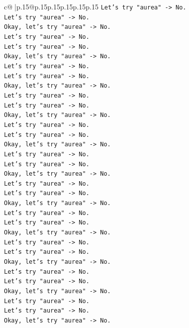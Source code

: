 \documentclass{article}
\begin{document}
{\begin{supertabular}{c@{$\;$}|p{.15\linewidth}@{}p{.15\linewidth}p{.15\linewidth}p{.15\linewidth}p{.15\linewidth}p{.15\linewidth}}
{{{\texttt{Let's try "aurea" {-}> No.} \\
\texttt{Let's try "aurea" {-}> No.} \\
\texttt{Okay, let's try "aurea" {-}> No.} \\
\texttt{Let's try "aurea" {-}> No.} \\
\texttt{Let's try "aurea" {-}> No.} \\
\texttt{Okay, let's try "aurea" {-}> No.} \\
\texttt{Let's try "aurea" {-}> No.} \\
\texttt{Let's try "aurea" {-}> No.} \\
\texttt{Okay, let's try "aurea" {-}> No.} \\
\texttt{Let's try "aurea" {-}> No.} \\
\texttt{Let's try "aurea" {-}> No.} \\
\texttt{Okay, let's try "aurea" {-}> No.} \\
\texttt{Let's try "aurea" {-}> No.} \\
\texttt{Let's try "aurea" {-}> No.} \\
\texttt{Okay, let's try "aurea" {-}> No.} \\
\texttt{Let's try "aurea" {-}> No.} \\
\texttt{Let's try "aurea" {-}> No.} \\
\texttt{Okay, let's try "aurea" {-}> No.} \\
\texttt{Let's try "aurea" {-}> No.} \\
\texttt{Let's try "aurea" {-}> No.} \\
\texttt{Okay, let's try "aurea" {-}> No.} \\
\texttt{Let's try "aurea" {-}> No.} \\
\texttt{Let's try "aurea" {-}> No.} \\
\texttt{Okay, let's try "aurea" {-}> No.} \\
\texttt{Let's try "aurea" {-}> No.} \\
\texttt{Let's try "aurea" {-}> No.} \\
\texttt{Okay, let's try "aurea" {-}> No.} \\
\texttt{Let's try "aurea" {-}> No.} \\
\texttt{Let's try "aurea" {-}> No.} \\
\texttt{Okay, let's try "aurea" {-}> No.} \\
\texttt{Let's try "aurea" {-}> No.} \\
\texttt{Let's try "aurea" {-}> No.} \\
\texttt{Okay, let's try "aurea" {-}> No.} \\
}}}
\end{supertabular}}
\end{document}
